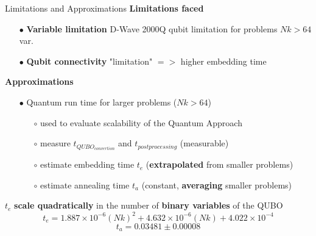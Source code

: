 		\begin{frame}[allowframebreaks]{Limitations and Approximations}
			\textbf{Limitations faced}
			\begin{itemize}
				\item[$\bullet$] \textbf{Variable limitation} D-Wave 2000Q qubit limitation for problems $Nk > 64$ var.
				\item[$\bullet$] \textbf{Qubit connectivity} "limitation" $=>$ higher embedding time
			\end{itemize}
			\textbf{Approximations}
			\begin{itemize}
				\item[$\bullet$] Quantum run time for larger problems ($Nk > 64$)
				\begin{itemize}
					\item[$\circ$] used to evaluate scalability of the Quantum Approach
					\item[$\circ$] measure $t_{QUBO_{convertion}}$ and $t_{postprocessing}$ (measurable)
					\item[$\circ$] estimate embedding time $t_{e}$ (\textbf{extrapolated} from smaller problems)
					\item[$\circ$] estimate annealing time $t_{a}$ (constant, \textbf{averaging} smaller problems) 
				\end{itemize} 
			\end{itemize}
			$t_e$ \textbf{scale quadratically} in the number of \textbf{binary variables} of the QUBO 
			\begin{equation}
				t_{e} = 1.887 \times 10^{-6}(Nk)^2 
				+ 4.632 \times 10^{-6}(Nk)
				+ 4.022 \times 10^{-4}
			\end{equation}
			\begin{equation}
				t_{a} = 0.03481 \pm 0.00008
			\end{equation}

		\end{frame}

